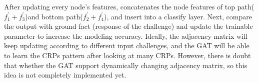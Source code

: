 After updating every node's features, concatenates the node features of top path($f_1^{'}+f_3^{'}$)and bottom path($f_2^{'}+f_4^{'}$), and insert into a classify layer. Next, compare the output with ground fact
(response of the challenge) and update the trainable parameter to increase the modeling accuracy. Ideally, the adjacency matrix will keep updating according to different input challenges, and the GAT will be able to 
learn the CRPs pattern after looking at many CRPs. However, there is doubt that whether the GAT support dynamically changing adjacency matrix, so this idea is not completely implemented yet.





